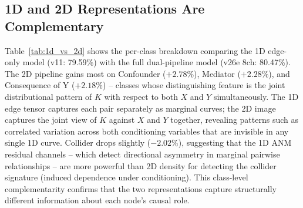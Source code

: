 \subsection{1D and 2D Representations Are Complementary}

Table~\ref{tab:1d_vs_2d} shows the per-class breakdown comparing the 1D edge-only model (v11: 79.59\%) with the full dual-pipeline model (v26e 8ch: 80.47\%). The 2D pipeline gains most on Confounder ($+2.78\%$), Mediator ($+2.28\%$), and Consequence of Y ($+2.18\%$) -- classes whose distinguishing feature is the joint distributional pattern of $K$ with respect to both $X$ and $Y$ simultaneously. The 1D edge tensor captures each pair separately as marginal curves; the 2D image captures the joint view of $K$ against $X$ and $Y$ together, revealing patterns such as correlated variation across both conditioning variables that are invisible in any single 1D curve. Collider drops slightly ($-2.02\%$), suggesting that the 1D ANM residual channels -- which detect directional asymmetry in marginal pairwise relationships -- are more powerful than 2D density for detecting the collider signature (induced dependence under conditioning). This class-level complementarity confirms that the two representations capture structurally different information about each node's causal role.

